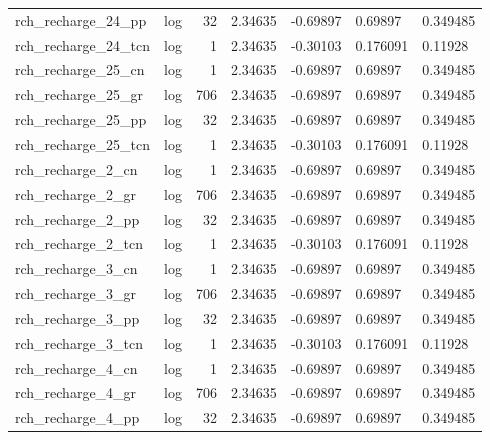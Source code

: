 \documentclass{article}
\begin{document}
\begin{center}
\begin{landscape}
\begin{longtable}{llrllll}
 rch\_recharge\_24\_pp &       log &     32 &        2.34635 &       -0.69897 &        0.69897 &           0.349485 \\
rch\_recharge\_24\_tcn &       log &      1 &        2.34635 &       -0.30103 &       0.176091 &            0.11928 \\
 rch\_recharge\_25\_cn &       log &      1 &        2.34635 &       -0.69897 &        0.69897 &           0.349485 \\
 rch\_recharge\_25\_gr &       log &    706 &        2.34635 &       -0.69897 &        0.69897 &           0.349485 \\
 rch\_recharge\_25\_pp &       log &     32 &        2.34635 &       -0.69897 &        0.69897 &           0.349485 \\
rch\_recharge\_25\_tcn &       log &      1 &        2.34635 &       -0.30103 &       0.176091 &            0.11928 \\
  rch\_recharge\_2\_cn &       log &      1 &        2.34635 &       -0.69897 &        0.69897 &           0.349485 \\
  rch\_recharge\_2\_gr &       log &    706 &        2.34635 &       -0.69897 &        0.69897 &           0.349485 \\
  rch\_recharge\_2\_pp &       log &     32 &        2.34635 &       -0.69897 &        0.69897 &           0.349485 \\
 rch\_recharge\_2\_tcn &       log &      1 &        2.34635 &       -0.30103 &       0.176091 &            0.11928 \\
  rch\_recharge\_3\_cn &       log &      1 &        2.34635 &       -0.69897 &        0.69897 &           0.349485 \\
  rch\_recharge\_3\_gr &       log &    706 &        2.34635 &       -0.69897 &        0.69897 &           0.349485 \\
  rch\_recharge\_3\_pp &       log &     32 &        2.34635 &       -0.69897 &        0.69897 &           0.349485 \\
 rch\_recharge\_3\_tcn &       log &      1 &        2.34635 &       -0.30103 &       0.176091 &            0.11928 \\
  rch\_recharge\_4\_cn &       log &      1 &        2.34635 &       -0.69897 &        0.69897 &           0.349485 \\
  rch\_recharge\_4\_gr &       log &    706 &        2.34635 &       -0.69897 &        0.69897 &           0.349485 \\
  rch\_recharge\_4\_pp &       log &     32 &        2.34635 &       -0.69897 &        0.69897 &           0.349485 \\

\end{longtable}
\end{landscape}
\end{center}
\end{document}
